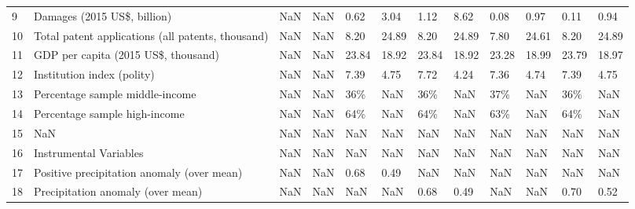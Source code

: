 \begin{tabular}{llllllllllll}
9  &                        Damages (2015 US\$, billion) &          NaN &        NaN &             0.62 &       3.04 &             1.12 &       8.62 &                           0.08 &       0.97 &               0.11 &        0.94 \\
10 &  Total patent applications (all patents, thousand) &          NaN &        NaN &             8.20 &      24.89 &             8.20 &      24.89 &                           7.80 &      24.61 &               8.20 &       24.89 \\
11 &                GDP per capita (2015 US\$, thousand) &          NaN &        NaN &            23.84 &      18.92 &            23.84 &      18.92 &                          23.28 &      18.99 &              23.79 &       18.97 \\
12 &                         Institution index (polity) &          NaN &        NaN &             7.39 &       4.75 &             7.72 &       4.24 &                           7.36 &       4.74 &               7.39 &        4.75 \\
13 &                    Percentage sample middle-income &          NaN &        NaN &              36\% &        NaN &              36\% &        NaN &                            37\% &        NaN &                36\% &         NaN \\
14 &                      Percentage sample high-income &          NaN &        NaN &              64\% &        NaN &              64\% &        NaN &                            63\% &        NaN &                64\% &         NaN \\
15 &                                                NaN &          NaN &        NaN &              NaN &        NaN &              NaN &        NaN &                            NaN &        NaN &                NaN &         NaN \\
16 &                             Instrumental Variables &          NaN &        NaN &              NaN &        NaN &              NaN &        NaN &                            NaN &        NaN &                NaN &         NaN \\
17 &         Positive precipitation anomaly (over mean) &          NaN &        NaN &             0.68 &       0.49 &              NaN &        NaN &                            NaN &        NaN &                NaN &         NaN \\
18 &                  Precipitation anomaly (over mean) &          NaN &        NaN &              NaN &        NaN &             0.68 &       0.49 &                            NaN &        NaN &               0.70 &        0.52 \\

\end{tabular}
